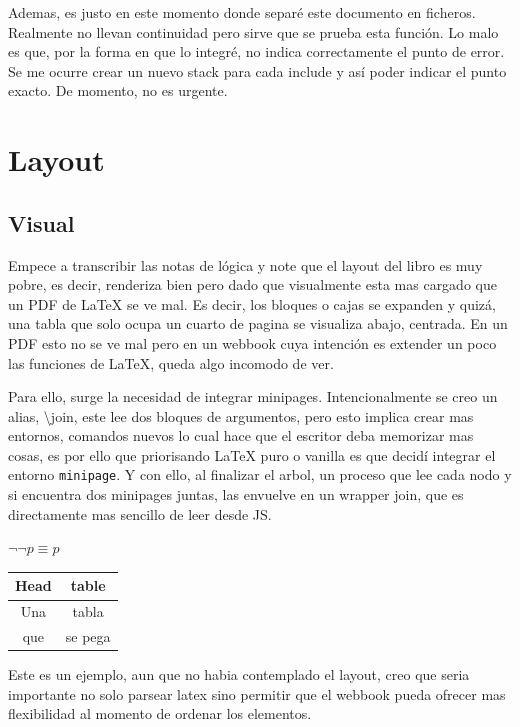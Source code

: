 \documentclass{article}
\begin{document}
  Ademas, es justo en este momento donde separé este documento en ficheros. Realmente no
  llevan continuidad pero sirve que se prueba esta función. Lo malo es que, por la forma
  en que lo integré, no indica correctamente el punto de error. Se me ocurre crear un
  nuevo stack para cada include y así poder indicar el punto exacto. De momento, no es urgente.

    \chapter { Layout }

  \section{ Visual }

  Empece a transcribir las notas de lógica y note que el layout del libro es muy pobre,
  es decir, renderiza bien pero dado que visualmente esta mas cargado que un PDF de
  LaTeX se ve mal. Es decir, los bloques o cajas se expanden y quizá, una tabla que
  solo ocupa un cuarto de pagina se visualiza abajo, centrada. En un PDF esto no se
  ve mal pero en un webbook cuya intención es extender un poco las funciones de LaTeX,
  queda algo incomodo de ver.

  Para ello, surge la necesidad de integrar minipages. Intencionalmente se creo un
  alias, \backslash join, este lee dos bloques de argumentos, pero esto implica
  crear mas entornos, comandos nuevos lo cual hace que el escritor deba memorizar
  mas cosas, es por ello que priorisando LaTeX puro o vanilla es que decidí integrar
  el entorno \texttt{minipage}. Y con ello, al finalizar el arbol, un proceso que
  lee cada nodo y si encuentra dos minipages juntas, las envuelve en un wrapper
  join, que es directamente mas sencillo de leer desde JS.

  \begin{minipage}[t]{0.48\textwidth}
    \begin{axiom}[title=Doble negación]
      $\lnot\lnot p \equiv p$
    \end{axiom}
  \end{minipage}\hfill

  \begin{minipage}[t]{0.48\textwidth}
    \begin{tabular}{cc}
      Head & table \\
      \hline
      Una & tabla \\
      que & se pega
    \end{tabular}
  \end{minipage}

  Este es un ejemplo, aun que no habia contemplado el layout, creo que seria importante
  no solo parsear latex sino permitir que el webbook pueda ofrecer mas flexibilidad
  al momento de ordenar los elementos.
\end{document}
